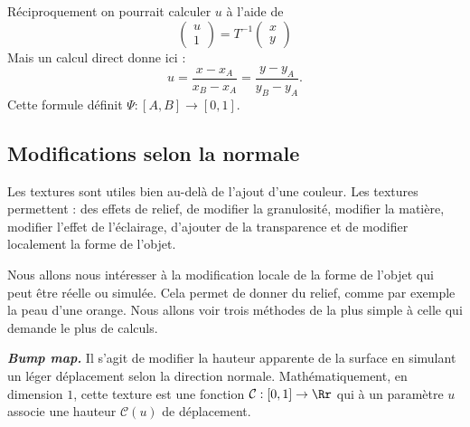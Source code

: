 \documentclass[11pt,class=report,crop=false]{standalone}
\begin{document}
Réciproquement on pourrait calculer $u$ à l'aide de 
$$\begin{pmatrix} u \\ 1 \end{pmatrix} = T^{-1} \begin{pmatrix} x \\ y \end{pmatrix}$$
Mais un calcul direct donne ici :
$$u = \frac{x-x_A}{x_B-x_A} = \frac{y-y_A}{y_B-y_A}.$$
Cette formule définit $\Psi : [A,B] \to [0,1]$.


\subsection{Modifications selon la normale}

Les textures sont utiles bien au-delà de l'ajout d'une couleur.
Les textures permettent : des effets de relief, de modifier la granulosité, modifier la matière, modifier l'effet de l'éclairage, d'ajouter de la transparence et de modifier localement la forme de l'objet.

Nous allons nous intéresser à la modification locale de la forme de l'objet qui peut être réelle ou simulée. Cela permet de donner du relief, comme par exemple la peau d'une orange.
Nous allons voir trois méthodes de la plus simple à celle qui demande le plus de calculs.

\textbf{\emph{Bump map.}}
Il s'agit de modifier la hauteur apparente de la surface en simulant un léger déplacement selon la direction normale.
Mathématiquement, en dimension $1$,  cette texture est une fonction $\mathcal{C} : [0,1] \to \Rr$ qui à un paramètre $u$ associe une hauteur $\mathcal{C}(u)$ de déplacement.

\end{document}
